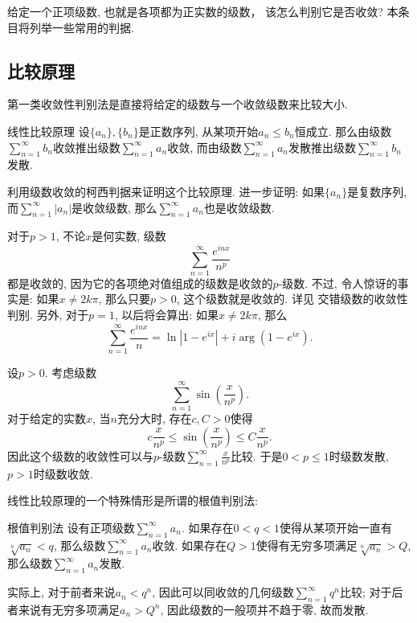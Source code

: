 

给定一个正项级数, 也就是各项都为正实数的级数， 该怎么判别它是否收敛? 本条目将列举一些常用的判据.

\subsection{比较原理}

第一类收敛性判别法是直接将给定的级数与一个收敛级数来比较大小. 

\begin{theorem}{线性比较原理}
设$\{a_n\},\{b_n\}$是正数序列, 从某项开始$a_n\leq b_n$恒成立. 那么由级数$\sum_{n=1}^\infty b_n$收敛推出级数$\sum_{n=1}^\infty a_n$收敛, 而由级数$\sum_{n=1}^\infty a_n$发散推出级数$\sum_{n=1}^\infty b_n$发散.
\end{theorem}
\begin{exercise}{}
利用级数收敛的柯西判据来证明这个比较原理. 进一步证明: 如果$\{a_n\}$是复数序列, 而$\sum_{n=1}^\infty|a_n|$是收敛级数, 那么$\sum_{n=1}^\infty a_n$也是收敛级数.
\end{exercise}

\begin{example}{}
对于$p>1$, 不论$x$是何实数, 级数
$$
\sum_{n=1}^\infty\frac{e^{inx}}{n^p}
$$
都是收敛的, 因为它的各项绝对值组成的级数是收敛的$p$-级数. 不过, 令人惊讶的事实是: 如果$x\neq 2k\pi$, 那么只要$p>0$, 这个级数就是收敛的. 详见 交错级数的收敛性判别. 另外, 对于$p=1$, 以后将会算出: 如果$x\neq 2k\pi$, 那么
$$
\sum_{n=1}^\infty\frac{e^{inx}}{n}=\ln|1-e^{ix}|+i\arg(1-e^{ix}).
$$
\end{example}

\begin{example}{}
设$p>0$. 考虑级数
$$
\sum_{n=1}^\infty\sin\left(\frac{x}{n^p}\right).
$$
对于给定的实数$x$, 当$n$充分大时, 存在$c,C>0$使得
$$
c\frac{x}{n^p}\leq\sin\left(\frac{x}{n^p}\right)\leq C\frac{x}{n^p}.
$$
因此这个级数的收敛性可以与$p$-级数$\sum_{n=1}^\infty\frac{x}{n^p}$比较. 于是$0<p\leq1$时级数发散, $p>1$时级数收敛.
\end{example}

线性比较原理的一个特殊情形是所谓的根值判别法:

\begin{theorem}{根值判别法}
设有正项级数$\sum_{n=1}^\infty a_n$. 如果存在$0<q<1$使得从某项开始一直有$\sqrt[n]{a_n}<q$, 那么级数$\sum_{n=1}^\infty a_n$收敛. 如果存在$Q>1$使得有无穷多项满足$\sqrt[n]{a_n}>Q$, 那么级数$\sum_{n=1}^\infty a_n$发散.
\end{theorem}
实际上, 对于前者来说$a_n<q^n$, 因此可以同收敛的几何级数$\sum_{n=1}^\infty q^n$比较; 对于后者来说有无穷多项满足$a_n>Q^n$, 因此级数的一般项并不趋于零, 故而发散.

